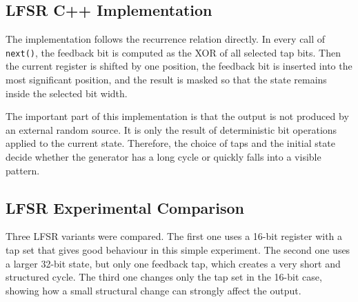 \subsection{LFSR C++ Implementation}

The implementation follows the recurrence relation directly. In every call of \texttt{next()}, the feedback bit is computed as the XOR of all selected tap bits. Then the current register is shifted by one position, the feedback bit is inserted into the most significant position, and the result is masked so that the state remains inside the selected bit width.


The important part of this implementation is that the output is not produced by an external random source. It is only the result of deterministic bit operations applied to the current state. Therefore, the choice of taps and the initial state decide whether the generator has a long cycle or quickly falls into a visible pattern.

\subsection{LFSR Experimental Comparison}

Three LFSR variants were compared. The first one uses a 16-bit register with a tap set that gives good behaviour in this simple experiment. The second one uses a larger 32-bit state, but only one feedback tap, which creates a very short and structured cycle. The third one changes only the tap set in the 16-bit case, showing how a small structural change can strongly affect the output.

\begin{table}[htbp]
\centering
\small
{}
\caption{LFSR parameter sets used in the experiment}
\label{tab:lfsr-parameters}
\end{table}

